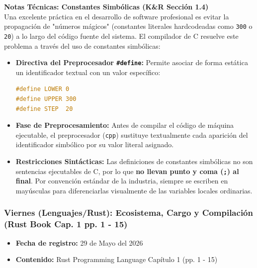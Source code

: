 \documentclass[11pt, a4paper]{article}
\begin{document}
\noindent\textbf{Notas Técnicas: Constantes Simbólicas (K\&R Sección 1.4)}\\[0.5em]
Una excelente práctica en el desarrollo de software profesional es evitar la propagación de "números mágicos" (constantes literales hardcodeadas como \texttt{300} o \texttt{20}) a lo largo del código fuente del sistema. El compilador de C resuelve este problema a través del uso de constantes simbólicas:
\begin{itemize}
  \item \textbf{Directiva del Preprocesador \texttt{\#define}:} Permite asociar de forma estática un identificador textual con un valor específico:
    \begin{lstlisting}[language=C]
#define LOWER 0
#define UPPER 300
#define STEP  20
    \end{lstlisting}
  \item \textbf{Fase de Preprocesamiento:} Antes de compilar el código de máquina ejecutable, el preprocesador (\texttt{cpp}) sustituye textualmente cada aparición del identificador simbólico por su valor literal asignado.
  \item \textbf{Restricciones Sintácticas:} Las definiciones de constantes simbólicas no son sentencias ejecutables de C, por lo que \textbf{no llevan punto y coma (\texttt{;}) al final}. Por convención estándar de la industria, siempre se escriben en mayúsculas para diferenciarlas visualmente de las variables locales ordinarias.
\end{itemize}

\subsubsection{Viernes (Lenguajes/Rust): Ecosistema, Cargo y Compilación (Rust Book Cap. 1 pp. 1 - 15)}
\begin{itemize}
  \item[] \textbf{Fecha de registro:} 29 de Mayo del 2026
  \item[] \textbf{Contenido:} Rust Programming Language Capítulo 1 (pp. 1 - 15)
\end{itemize}
\end{document}
